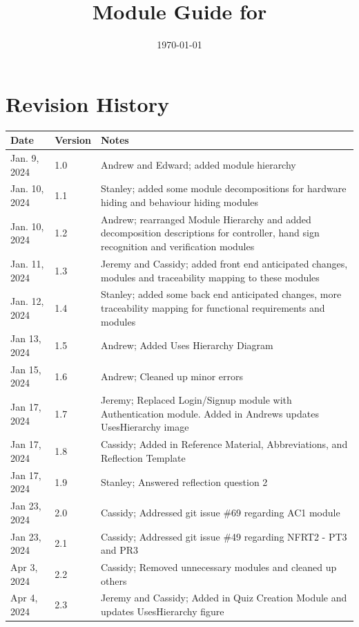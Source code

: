 \documentclass[12pt, titlepage]{article}
\begin{document}
\title{Module Guide for \progname{}} 
\author{\authname}
\date{\today}

\maketitle


\section{Revision History}

\begin{tabularx}{\textwidth}{p{3cm}p{2cm}X}
\toprule {\bf Date} & {\bf Version} & {\bf Notes}\\
\midrule
Jan. 9, 2024 & 1.0 & Andrew and Edward; added module hierarchy\\
Jan. 10, 2024 & 1.1 & Stanley; added some module decompositions for hardware hiding and behaviour hiding modules\\
Jan. 10, 2024 & 1.2 & Andrew; rearranged Module Hierarchy and added decomposition descriptions for controller, hand sign recognition and verification modules\\
Jan. 11, 2024 & 1.3 & Jeremy and Cassidy; added front end anticipated changes, modules and traceability mapping to these modules\\
Jan. 12, 2024 & 1.4 & Stanley; added some back end anticipated changes, more traceability mapping for functional requirements and modules\\
Jan 13, 2024 & 1.5 & Andrew; Added Uses Hierarchy Diagram\\
Jan 15, 2024 & 1.6 & Andrew; Cleaned up minor errors\\
Jan 17, 2024 & 1.7 & Jeremy; Replaced Login/Signup module with Authentication module. Added in Andrews updates UsesHierarchy image\\
Jan 17, 2024 & 1.8 & Cassidy; Added in Reference Material, Abbreviations, and Reflection Template\\
Jan 17, 2024 & 1.9 & Stanley; Answered reflection question 2\\
Jan 23, 2024 & 2.0 & Cassidy; Addressed git issue \#69 regarding AC1 module \\
Jan 23, 2024 & 2.1 & Cassidy; Addressed git issue \#49 regarding NFRT2 - PT3 and PR3 \\
Apr 3, 2024 & 2.2 & Cassidy; Removed unnecessary modules and cleaned up others \\
Apr 4, 2024 & 2.3 & Jeremy and Cassidy; Added in Quiz Creation Module and updates UsesHierarchy figure \\
\bottomrule
\end{tabularx}
\end{document}
